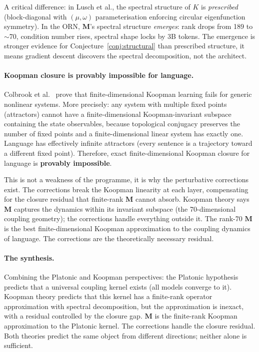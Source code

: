 \documentclass[11pt, a4paper]{article}
\newcommand{\M}{\mathbf{M}}
\theoremstyle{plain}
\theoremstyle{definition}
\theoremstyle{remark}
\begin{document}
A critical difference: in Lusch et al., the spectral structure of $K$ is \emph{prescribed} (block-diagonal with $(\mu, \omega)$ parameterisation enforcing circular eigenfunction symmetry).
In the ORN, $\M$'s spectral structure \emph{emerges}: rank drops from 189 to $\sim$70, condition number rises, spectral shape locks by 3B tokens.
The emergence is stronger evidence for Conjecture~\ref{conj:structural} than prescribed structure, it means gradient descent discovers the spectral decomposition, not the architect.

\paragraph{Koopman closure is provably impossible for language.}
Colbrook et al.~\cite{colbrook2024limits} prove that finite-dimensional Koopman learning fails for generic nonlinear systems.
More precisely: any system with multiple fixed points (attractors) cannot have a finite-dimensional Koopman-invariant subspace containing the state observables, because topological conjugacy preserves the number of fixed points and a finite-dimensional linear system has exactly one.
Language has effectively infinite attractors (every sentence is a trajectory toward a different fixed point).
Therefore, exact finite-dimensional Koopman closure for language is \textbf{provably impossible}.

This is not a weakness of the programme, it is why the perturbative corrections exist.
The corrections break the Koopman linearity at each layer, compensating for the closure residual that finite-rank $\M$ cannot absorb.
Koopman theory says $\M$ captures the dynamics within its invariant subspace (the 70-dimensional coupling geometry); the corrections handle everything outside it.
The rank-70 $\M$ is the best finite-dimensional Koopman approximation to the coupling dynamics of language.
The corrections are the theoretically necessary residual.

\paragraph{The synthesis.}
Combining the Platonic and Koopman perspectives: the Platonic hypothesis predicts that a universal coupling kernel exists (all models converge to it).
Koopman theory predicts that this kernel has a finite-rank operator approximation with spectral decomposition, but the approximation is inexact, with a residual controlled by the closure gap.
$\M$ is the finite-rank Koopman approximation to the Platonic kernel.
The corrections handle the closure residual.
Both theories predict the same object from different directions; neither alone is sufficient.
\end{document}

